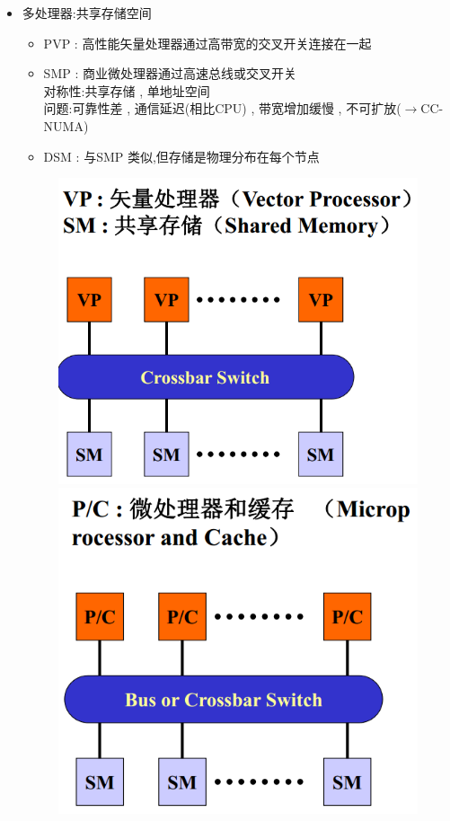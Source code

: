 \documentclass[UTF8,a4paper]{ctexart}
\begin{document}
  \begin{itemize}
    \item 多处理器:共享存储空间
    \begin{itemize}
      \item PVP : 高性能矢量处理器通过高带宽的交叉开关连接在一起
      \item SMP : 商业微处理器通过高速总线或交叉开关\\
      对称性:共享存储 , 单地址空间\\
      问题:可靠性差 , 通信延迟(相比CPU) , 带宽增加缓慢 , 不可扩放($\to$CC-NUMA)
      \item DSM : 与SMP 类似,但存储是物理分布在每个节点
    \end{itemize}
    \begin{figure}[H]
      \centering
      \includegraphics[scale = 0.3]{assets/ParallelComputing_11aed.png}
      \includegraphics[scale = 0.3]{assets/ParallelComputing_2b522.png}

\end{figure}
\end{itemize}
\end{document}
